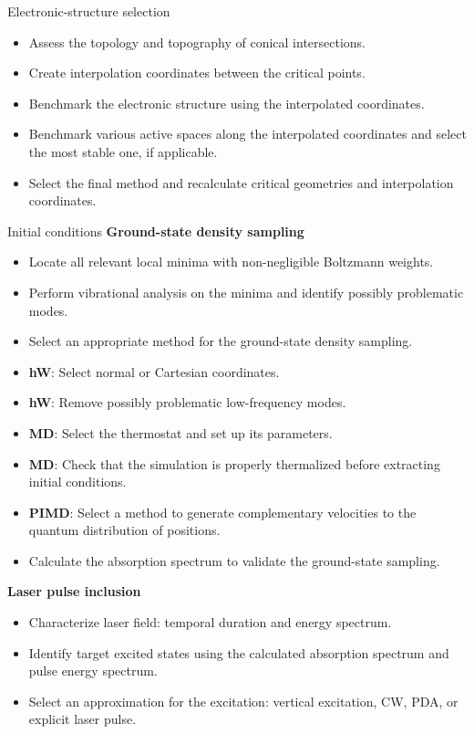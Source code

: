 \documentclass[9pt,bestpractices,pubversion]{livecoms}
\begin{document}
\begin{Checklists*}[p!]
\begin{checklist}{Electronic-structure selection}
\begin{itemize}
\item Assess the topology and topography of conical intersections.
\item Create interpolation coordinates between the critical points.
\item Benchmark the electronic structure using the interpolated coordinates.
\item Benchmark various active spaces along the interpolated coordinates and select the most stable one, if applicable.
\item Select the final method and recalculate critical geometries and interpolation coordinates.
\end{itemize}
\end{checklist}

\begin{checklist}{Initial conditions}
\textbf{Ground-state density sampling}
\begin{itemize}
\item Locate all relevant local minima with non-negligible Boltzmann weights. 
\item Perform vibrational analysis on the minima and identify possibly problematic modes. 
\item Select an appropriate method for the ground-state density sampling. 
\item \textbf{hW}: Select normal or Cartesian coordinates. 
\item \textbf{hW}: Remove possibly problematic low-frequency modes. 
\item \textbf{MD}: Select the thermostat and set up its parameters. 
\item \textbf{MD}: Check that the simulation is properly thermalized before extracting initial conditions.
\item \textbf{PIMD}: Select a method to generate complementary velocities to the quantum distribution of positions. 
\item Calculate the absorption spectrum to validate the ground-state sampling.
\end{itemize}

\textbf{Laser pulse inclusion} 
\begin{itemize}
    \item Characterize laser field: temporal duration and energy spectrum.
    \item Identify target excited states using the calculated absorption spectrum and pulse energy spectrum. 
    \item Select an approximation for the excitation: vertical excitation, CW, PDA, or explicit laser pulse. 
\end{itemize}
    
\end{checklist}
\end{Checklists*}
\end{document}
